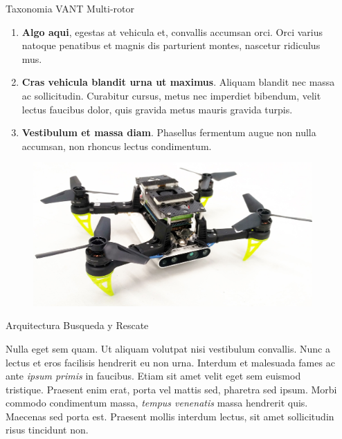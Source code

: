 \documentclass[final]{beamer}
\newlength{\sepwidth}
\newlength{\colwidth}
\newcommand{\separatorcolumn}{\begin{column}{\sepwidth}\end{column}}
\begin{document}
\begin{frame}[t]
\begin{columns}[t]
\separatorcolumn

\begin{column}{\colwidth}
  
  \begin{block}{\color{teal}Taxonomia VANT Multi-rotor}
        
    \begin{enumerate}
      \item \textbf{Algo aqui}, egestas at vehicula et, convallis
        accumsan orci. Orci varius natoque penatibus et magnis dis parturient
        montes, nascetur ridiculus mus.
      \item \textbf{Cras vehicula blandit urna ut maximus}. Aliquam blandit nec
        massa ac sollicitudin. Curabitur cursus, metus nec imperdiet bibendum,
        velit lectus faucibus dolor, quis gravida metus mauris gravida turpis.
      \item \textbf{Vestibulum et massa diam}. Phasellus fermentum augue non
        nulla accumsan, non rhoncus lectus condimentum.
    \end{enumerate}

    \begin{figure}[t]
      \includegraphics[width=38cm]{images/uav_planning_drone.jpg}
      \centering
    \end{figure}
    
  \end{block}
  
  \begin{block}{\color{teal}Arquitectura Busqueda y Rescate}
    
    Nulla eget sem quam. Ut aliquam volutpat nisi vestibulum convallis. Nunc a
    lectus et eros facilisis hendrerit eu non urna. Interdum et malesuada fames
    ac ante \textit{ipsum primis} in faucibus. Etiam sit amet velit eget sem
    euismod tristique. Praesent enim erat, porta vel mattis sed, pharetra sed
    ipsum. Morbi commodo condimentum massa, \textit{tempus venenatis} massa
    hendrerit quis. Maecenas sed porta est. Praesent mollis interdum lectus,
    sit amet sollicitudin risus tincidunt non.


\end{block}
\end{column}
\end{columns}
\end{frame}
\end{document}
